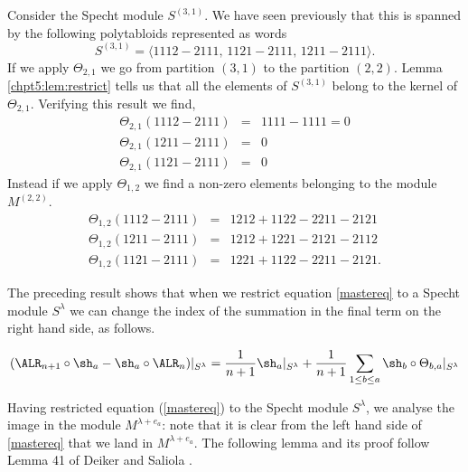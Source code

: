 \documentclass[11pt]{report}
\begin{document}
\begin{example}
	Consider the Specht module $S^{(3,1)}$. We have seen previously that 
	this is spanned by the following polytabloids represented as words
	\[S^{(3,1)} = \langle 1112 -2111, \, 1121 -2111, \, 1211 - 2111 
	\rangle. \]
	If we apply $\Theta_{2,1}$ we go from partition $(3,1)$ to the 
	partition $(2,2)$. Lemma \ref{chpt5:lem:restrict} tells us that all the 
	elements of $S^{(3,1)}$ belong to the kernel of $\Theta_{2,1}$. 
	Verifying this result we find,
	\begin{eqnarray*}
		\Theta_{2,1} (1112 - 2111) & = & 1111 -1111 = 0 \\
		\Theta_{2,1} (1211 - 2111) & = & 0 \\
		\Theta_{2,1} (1121 - 2111) & = & 0 	
	\end{eqnarray*}
	Instead if we apply $\Theta_{1,2}$ we find a non-zero elements belonging 
	to the module $M^{(2,2)}$. 
	\begin{eqnarray*}
		\Theta_{1,2} (1112 - 2111) & = & 1212 + 1122 -2211 - 2121 \\
		\Theta_{1,2} (1211 - 2111) & = & 1212 +1221 -2121 - 2112 \\
		\Theta_{1,2} (1121 - 2111) & = & 1221 + 1122 - 2211 - 2121. 	
	\end{eqnarray*}
	
	
\end{example}

The preceding result shows that when we restrict equation 
\eqref{mastereq} to a Specht module $S^\lambda$ we can change the index of 
the 
summation in the final term on the right hand side, as follows.

\begin{corollary}
	\label{cor:spechtrestrict}
	\begin{align}
	(\ALR_{n+1} \circ \sh_{a} - \sh_{a} \circ \ALR_{n})|_{S^{\lambda}} = 
	\frac{1}{n+1}\sh_{a}|_{S^{\lambda}} + 
	\frac{1}{n+1}\sum_{1 \leq b \leq a} 
	\sh_{b}\circ\Theta_{b,a}|_{S^{\lambda}} \label{eqn:restricted}
	\end{align}
\end{corollary}




Having restricted equation (\ref{mastereq}) to the Specht module 
$S^{\lambda}$, we analyse the image in the module $M^{\lambda +e_{a}}$: 
note that it is clear from the left hand side of \eqref{mastereq} that we 
land in $M^{\lambda+e_a}$. The following lemma and its proof follow Lemma 41 of Deiker and Saliola \cite{dieker2018spectral}.
\end{document}
